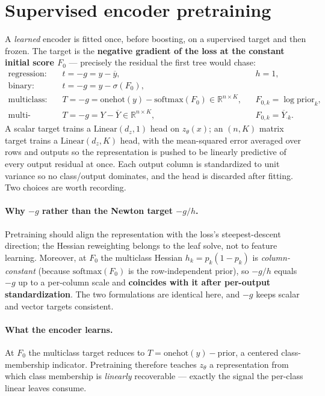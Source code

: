\documentclass[11pt]{article}
\newcommand{\R}{\mathbb{R}}
\newcommand{\zt}{z_{\theta}}
\begin{document}
\section{Supervised encoder pretraining}
\label{sec:pretrain}

A \emph{learned} encoder is fitted once, before boosting, on a supervised target and
then frozen. The target is the \textbf{negative gradient of the loss at the constant
initial score $F_0$} --- precisely the residual the first tree would chase:
\begin{equation}
\begin{aligned}
\text{regression:} \quad & t = -g = y - \overline{y}, && h = 1,\\
\text{binary:} \quad & t = -g = y - \sigma(F_0), \\
\text{multiclass:} \quad & T = -g = \mathrm{onehot}(y) - \mathrm{softmax}(F_0) \in \R^{n\times K}, && F_{0,k} = \log \mathrm{prior}_k,\\
\text{multi-output:} \quad & T = -g = Y - \overline{Y} \in \R^{n\times K}, && F_{0,k} = \overline{Y}_{\cdot k}.
\end{aligned}
\end{equation}
A scalar target trains a $\mathrm{Linear}(d_z, 1)$ head on $\zt(x)$; an $(n,K)$ matrix
target trains a $\mathrm{Linear}(d_z, K)$ head, with the mean-squared error averaged
over rows and outputs so the representation is pushed to be linearly predictive of
every output residual at once. Each output column is standardized to unit variance so
no class/output dominates, and the head is discarded after fitting. Two choices are
worth recording.

\paragraph{Why $-g$ rather than the Newton target $-g/h$.}
Pretraining should align the representation with the loss's steepest-descent
direction; the Hessian reweighting belongs to the leaf solve, not to feature learning.
Moreover, at $F_0$ the multiclass Hessian $h_k = p_k(1-p_k)$ is \emph{column-constant}
(because $\mathrm{softmax}(F_0)$ is the row-independent prior), so $-g/h$ equals $-g$
up to a per-column scale and \textbf{coincides with it after per-output
standardization}. The two formulations are identical here, and $-g$ keeps scalar and
vector targets consistent.

\paragraph{What the encoder learns.}
At $F_0$ the multiclass target reduces to $T = \mathrm{onehot}(y) - \mathrm{prior}$, a
centered class-membership indicator. Pretraining therefore teaches $\zt$ a
representation from which class membership is \emph{linearly} recoverable --- exactly
the signal the per-class linear leaves consume.
\end{document}
